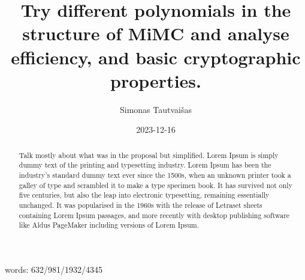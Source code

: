 \documentclass{Resources/UoBLab1}
\theoremstyle{definition}
\begin{document}

\title{Try different polynomials in the structure of MiMC and analyse efficiency, and basic cryptographic properties.}
\author{Simonas Tautvaišas}
\date{2023-12-16}

\maketitle


words: 632/981/1932/4345

\begin{abstract}
    Talk mostly about what was in the proposal but simplified. Lorem Ipsum is simply dummy text of the printing and typesetting industry. Lorem Ipsum has been the industry's standard dummy text ever since the 1500s, when an unknown printer took a galley of type and scrambled it to make a type specimen book. It has survived not only five centuries, but also the leap into electronic typesetting, remaining essentially unchanged. It was popularised in the 1960s with the release of Letraset sheets containing Lorem Ipsum passages, and more recently with desktop publishing software like Aldus PageMaker including versions of Lorem Ipsum.
\end{abstract}

\end{document}
